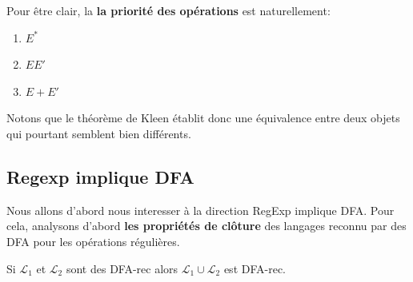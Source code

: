 Pour être clair, la \textbf{la priorité des opérations} est naturellement:

\begin{enumerate}
    \item $E^*$
    \item $EE'$
    \item $E+E'$
\end{enumerate}

Notons que le théorème de Kleen établit donc une équivalence entre deux objets qui pourtant semblent bien différents.
\subsection*{Regexp implique DFA}

Nous allons d'abord nous interesser à la direction RegExp implique DFA.
Pour cela, analysons d'abord \textbf{les propriétés de clôture} des langages reconnu par des DFA pour les opérations régulières.

\begin{lemme}
    Si $\mathcal{L}_1$ et  $\mathcal{L}_2$ sont des DFA-rec alors $\mathcal{L}_1 \cup \mathcal{L}_2$ est DFA-rec.
\end{lemme}

